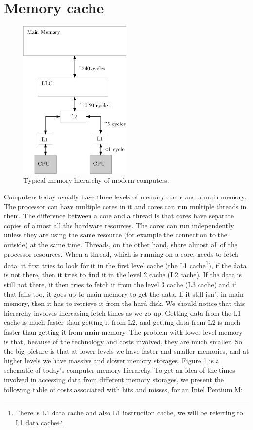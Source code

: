 \documentclass[12pt]{diicc}
\begin{document}
\section{Memory cache}

\begin{figure}[h!]
	\centering
		\includegraphics[width=0.5\textwidth]{cache}
	\caption{Typical memory hierarchy of modern computers.}
	\label{fig:cache}
\end{figure}

Computers today usually have three levels of memory cache and a main memory. The processor can have multiple cores in it and cores can run multiple threads in them. The difference between a core and a thread is that cores have separate copies of almost all the hardware resources. The cores can run independently unless they are using the same resource (for example the connection to the outside) at the same time. Threads, on the other hand, share almost all of the processor resources. When a thread, which is running on a core, needs to fetch data, it first tries to look for it in the first level cache (the L1 cache\footnote{There is L1 data cache and also L1 instruction cache, we will be referring to L1 data cache}), if the data is not there, then it tries to find it in the level 2 cache (L2 cache). If the data is still not there, it then tries to fetch it from the level 3 cache (L3 cache) and if that fails too, it goes up to main memory to get the data. If it still isn't in main memory, then it has to retrieve it from the hard disk. We should notice that this hierarchy involves increasing fetch times as we go up. Getting data from the L1 cache is much faster than getting it from L2, and getting data from L2 is much faster than getting it from main memory. The problem with lower level memory is that, because of the technology and costs involved, they are much smaller. So the big picture is that at lower levels we have faster and smaller memories, and at higher levels we have massive and slower memory storages. Figure \ref{fig:cache} is a schematic of today's computer memory hierarchy. To get an idea of the times involved in accessing data from different memory storages, we present the following table of costs associated with hits and misses, for an Intel Pentium M:
\end{document}
